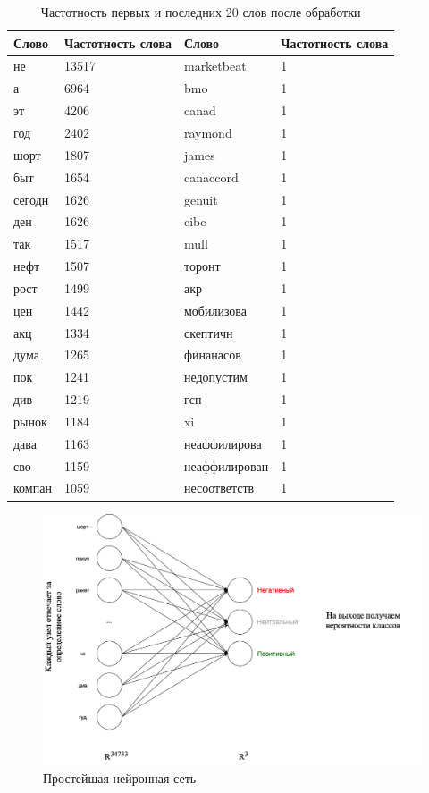 \documentclass{article}
\begin{document}
\begin{table}[h]
	\caption{Частотность первых и последних 20 слов после обработки}
	\label{tab:table4}
	\centering
	\begin{tabular}{llll}
		\toprule
		Слово & Частотность слова &Слово & Частотность слова\\
		\midrule
		не & 13517 & marketbeat & 1\\ 
		а & 6964 & bmo & 1\\ 
		эт & 4206 & canad & 1\\ 
		год & 2402 & raymond & 1\\ 
		шорт & 1807 & james & 1\\ 
		быт & 1654 & canaccord & 1\\ 
		сегодн & 1626 & genuit & 1\\ 
		ден & 1626 & cibc & 1\\ 
		так & 1517 & mull & 1\\ 
		нефт & 1507 & торонт & 1\\ 
		рост & 1499 & акр & 1\\ 
		цен & 1442 & мобилизова & 1\\ 
		акц & 1334 & скептичн & 1\\ 
		дума & 1265 & финанасов & 1\\ 
		пок & 1241 & недопустим & 1\\ 
		див & 1219 & гсп & 1\\ 
		рынок & 1184 & xi & 1\\ 
		дава & 1163 & неаффилирова & 1\\ 
		сво & 1159 & неаффилирован & 1\\ 
		компан & 1059 & несоответств & 1\\
		\bottomrule
	\end{tabular}
	\label{tab:table3}
\end{table}

\begin{figure}[!h]
	\centering
	\caption{Простейшая нейронная сеть}
	\includegraphics[scale=0.3]{nn.png}
\end{figure}
\end{document}
